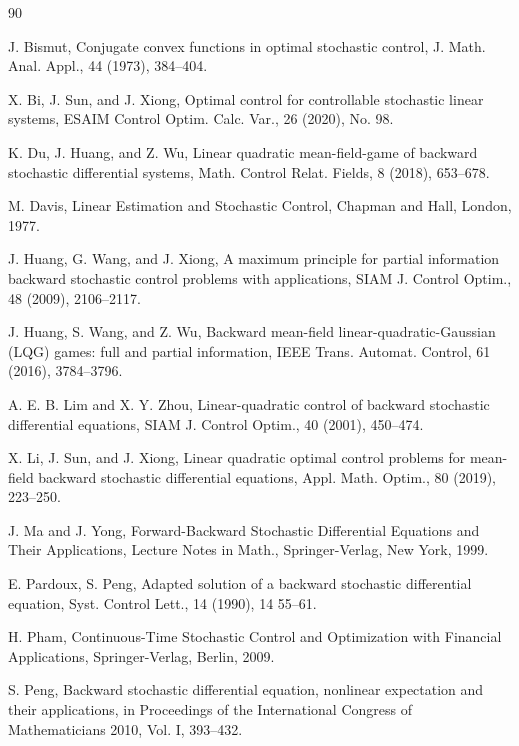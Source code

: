 \documentclass[11pt,times,twoside]{article}
\begin{document}
\begin{thebibliography}{90}
\addtolength{\itemsep}{-1.5ex}

J. Bismut,
Conjugate convex functions in optimal stochastic control,
J. Math. Anal. Appl., 44 (1973), 384--404.

X. Bi, J. Sun, and J. Xiong,
Optimal control for controllable stochastic linear systems,
ESAIM Control Optim. Calc. Var., 26 (2020), No. 98.

K. Du, J. Huang, and Z. Wu,
Linear quadratic mean-field-game of backward stochastic differential systems,
Math. Control Relat. Fields, 8 (2018), 653--678.

M. Davis,
Linear Estimation and Stochastic Control,  Chapman and Hall, London, 1977.

J. Huang, G. Wang, and J. Xiong,
A maximum principle for partial information backward stochastic control problems with applications,
SIAM J. Control Optim., 48 (2009), 2106--2117.

J. Huang, S. Wang, and Z. Wu,
Backward mean-field linear-quadratic-Gaussian (LQG) games: full and partial information,
IEEE Trans. Automat. Control, 61 (2016), 3784--3796.


A. E. B. Lim and X. Y. Zhou,
Linear-quadratic control of backward stochastic differential equations,
SIAM J. Control Optim., 40 (2001), 450--474.


X. Li, J. Sun, and J. Xiong,
Linear quadratic optimal control problems for mean-field backward stochastic differential equations,
Appl. Math. Optim., 80 (2019),  223--250.


J. Ma and J. Yong,
Forward-Backward Stochastic Differential Equations and Their Applications,
Lecture Notes in Math., Springer-Verlag, New York, 1999.

E. Pardoux, S. Peng,
Adapted solution of a backward stochastic differential equation,
Syst. Control Lett., 14 (1990), 14 55--61.


H. Pham,
Continuous-Time Stochastic Control and Optimization with Financial Applications,
Springer-Verlag, Berlin, 2009.


S. Peng,
Backward stochastic differential equation, nonlinear expectation and their applications,
in Proceedings of the International Congress of Mathematicians 2010, Vol. I,  393--432.


\end{thebibliography}
\end{document}
